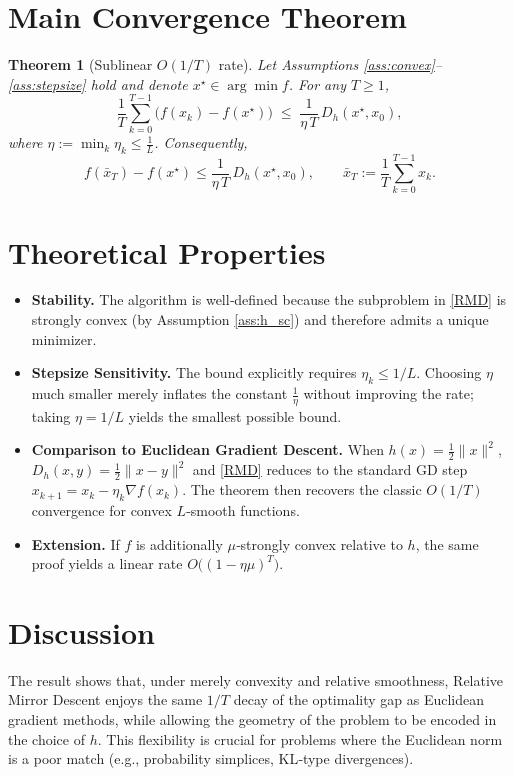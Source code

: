 \documentclass{article}
\newtheorem{theorem}{Theorem}
\newcommand{\grad}{\nabla}
\newcommand{\Breg}[2]{D_{h}(#1,#2)}
\begin{document}
\section*{Main Convergence Theorem}
\begin{theorem}[Sublinear $O(1/T)$ rate]
\label{thm:conv}
Let Assumptions \ref{ass:convex}–\ref{ass:stepsize} hold and denote $x^{\star}\in\arg\min f$. For any $T\ge1$,
\[
    \frac{1}{T}\sum_{k=0}^{T-1}\bigl(f(x_{k})-f(x^{\star})\bigr)
    \;\le\;
    \frac{1}{\eta\,T}\,\Breg{x^{\star}}{x_{0}},
\]
where $\eta:=\min_{k}\eta_{k}\le\frac{1}{L}$. Consequently,
\[
    f(\bar x_{T})-f(x^{\star})\le\frac{1}{\eta\,T}\,\Breg{x^{\star}}{x_{0}},\qquad 
    \bar x_{T}:=\frac{1}{T}\sum_{k=0}^{T-1}x_{k}.
\]
\end{theorem}

\section*{Theoretical Properties}
\begin{itemize}
    \item \textbf{Stability.} The algorithm is well‑defined because the subproblem in \eqref{RMD} is strongly convex (by Assumption \ref{ass:h_sc}) and therefore admits a unique minimizer.
    \item \textbf{Stepsize Sensitivity.} The bound explicitly requires $\eta_{k}\le 1/L$. Choosing $\eta$ much smaller merely inflates the constant $\frac{1}{\eta}$ without improving the rate; taking $\eta=1/L$ yields the smallest possible bound.
    \item \textbf{Comparison to Euclidean Gradient Descent.} When $h(x)=\tfrac12\|x\|^{2}$, $\Breg{x}{y}=\tfrac12\|x-y\|^{2}$ and \eqref{RMD} reduces to the standard GD step $x_{k+1}=x_{k}-\eta_{k}\grad f(x_{k})$. The theorem then recovers the classic $O(1/T)$ convergence for convex $L$‑smooth functions.
    \item \textbf{Extension.} If $f$ is additionally $\mu$‑strongly convex relative to $h$, the same proof yields a linear rate $O\big((1-\eta\mu)^{T}\big)$.
\end{itemize}

\section*{Discussion}
The result shows that, under merely convexity and relative smoothness, Relative Mirror Descent enjoys the same $1/T$ decay of the optimality gap as Euclidean gradient methods, while allowing the geometry of the problem to be encoded in the choice of $h$. This flexibility is crucial for problems where the Euclidean norm is a poor match (e.g., probability simplices, KL‑type divergences).
\end{document}
